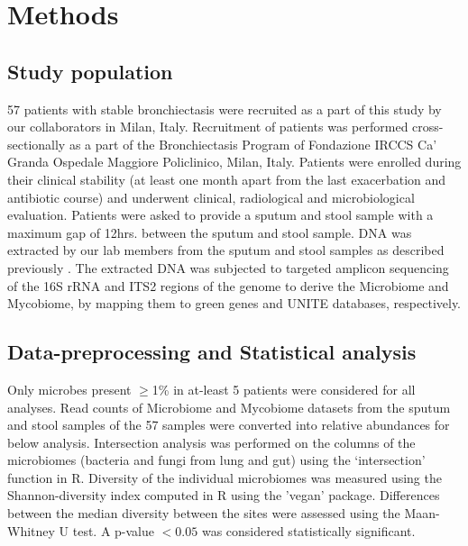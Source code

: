 \section{Methods}

\subsection{Study population}
57 patients with stable bronchiectasis were recruited as a part of this study by our collaborators in Milan, Italy. Recruitment of patients was performed cross-sectionally as a part of the Bronchiectasis Program of Fondazione IRCCS Ca' Granda Ospedale Maggiore Policlinico, Milan, Italy. Patients were enrolled during their clinical stability (at least one month apart from the last exacerbation and antibiotic course) and underwent clinical, radiological and microbiological evaluation. Patients were asked to provide a sputum and stool sample with a maximum gap of 12hrs. between the sputum and stool sample. DNA was extracted by our lab members from the sputum and stool samples as described previously \cite{Mac1800766}. The extracted DNA was subjected to targeted amplicon sequencing of the 16S rRNA and ITS2 regions of the genome to derive the Microbiome and Mycobiome, by mapping them to green genes and UNITE databases, respectively.

\subsection{Data-preprocessing and Statistical analysis}

Only microbes present $\geq$1\% in at-least 5 patients were considered for all analyses. Read counts of Microbiome and Mycobiome datasets from the sputum and stool samples of the 57 samples were converted into relative abundances for below analysis. Intersection analysis was performed on the columns of the microbiomes (bacteria and fungi from lung and gut) using the `intersection' function in R. Diversity of the individual microbiomes was measured using the Shannon-diversity index computed in R using the 'vegan' package. Differences between the median diversity between the sites were assessed using the Maan-Whitney U test. A p-value $< 0.05$ was considered statistically significant.

